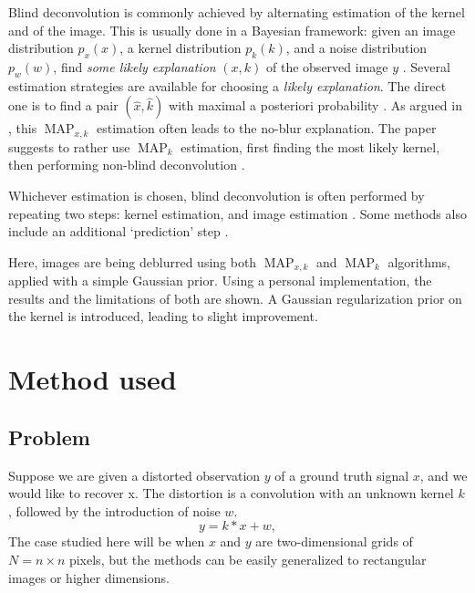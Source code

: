 \documentclass[english,a4paper]{article}
\theoremstyle{plain}
\theoremstyle{definition}
\theoremstyle{remark}
\DeclareMathOperator{\MAP}{MAP}
\begin{document}
Blind deconvolution is commonly achieved by alternating estimation of the kernel and of the image.
This is usually done in a Bayesian framework: given an image distribution $p_x(x)$, a kernel distribution $p_k(k)$, and a noise distribution $p_w(w)$, find \emph{some likely explanation} $(x,k)$ of the observed image $y$ \cite{levin2009understanding,levin2011efficient}.
Several estimation strategies are available for choosing a \emph{likely explanation}. The direct one is to find a pair $(\hat{x},\hat{k})$ with maximal a posteriori probability \cite{cho2009fast,cho2007removing,jia2007single,shan2008high,xu2010two}.
As argued in \cite{levin2011efficient,levin2009understanding}, this $\MAP_{x,k}$ estimation often leads to the no-blur explanation. The paper suggests to rather use $\MAP_k$ estimation, first finding the most likely kernel, then performing non-blind deconvolution \cite{fergus2006removing,whyte2012non}.

Whichever estimation is chosen, blind deconvolution is often performed by repeating two steps: kernel estimation, and image estimation \cite{jia2007single,fergus2006removing,levin2009understanding,levin2011efficient,shan2008high}. Some methods also include an additional `prediction' step \cite{cho2009fast}.

Here, images are being deblurred using both $\MAP_{x,k}$ and $\MAP_k$ algorithms, applied with a simple Gaussian prior. Using a personal implementation, the results and the limitations of both are shown. A Gaussian regularization prior on the kernel is introduced, leading to slight improvement.



\section{Method used}

\subsection{Problem}
Suppose we are given a distorted observation $y$ of a ground truth signal $x$, and we would like to recover x. The distortion is a convolution with an unknown kernel $k$, followed by the introduction of noise $w$.
\begin{equation}\label{eq:convolution}
y = k*x + w ,
\end{equation}
The case studied here will be when $x$ and $y$ are two-dimensional grids of $N = n \times n$ pixels, but the methods can be easily generalized to rectangular images or higher dimensions.
\end{document}
